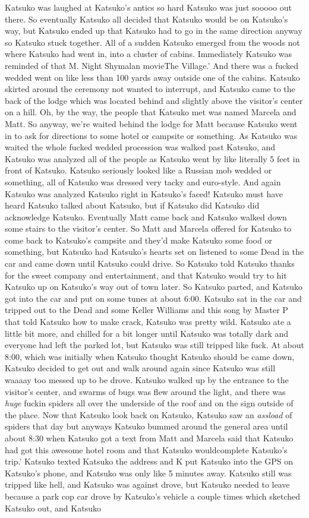 \documentclass[12pt]{book}
\begin{document}
Katsuko was laughed at Katsuko's antics so hard Katsuko was just sooooo out there. So eventually Katsuko all decided that Katsuko would be on Katsuko's way, but Katsuko ended up that Katsuko had to go in the same direction anyway so Katsuko stuck together. All of a sudden Katsuko emerged from the woods not where Katsuko had went in, into a cluster of cabins. Immediately Katsuko was reminded of that M. Night Shymalan movieThe Village.' And there was a fucked wedded went on like less than 100 yards away outside one of the cabins. Katsuko skirted around the ceremony not wanted to interrupt, and Katsuko came to the back of the lodge which was located behind and slightly above the visitor's center on a hill. Oh, by the way, the people that Katsuko met was named Marcela and Matt. So anyway, we're waited behind the lodge for Matt because Katsuko went in to ask for directions to some hotel or campsite or something. As Katsuko was waited the whole fucked wedded procession was walked past Katsuko, and Katsuko was analyzed all of the people as Katsuko went by like literally 5 feet in front of Katsuko. Katsuko seriously looked like a Russian mob wedded or something, all of Katsuko was dressed very tacky and euro-style. And again Katsuko was analyzed Katsuko right in Katsuko's faced! Katsuko must have heard Katsuko talked about Katsuko, but if Katsuko did Katsuko did acknowledge Katsuko. Eventually Matt came back and Katsuko walked down some stairs to the visitor's center. So Matt and Marcela offered for Katsuko to come back to Katsuko's campsite and they'd make Katsuko some food or something, but Katsuko had Katsuko's hearts set on listened to some Dead in the car and came down until Katsuko could drive. So Katsuko told Katsuko thanks for the sweet company and entertainment, and that Katsuko would try to hit Katsuko up on Katsuko's way out of town later. So Katsuko parted, and Katsuko got into the car and put on some tunes at about 6:00. Katsuko sat in the car and tripped out to the Dead and some Keller Williams and this song by Master P that told Katsuko how to make crack, Katsuko was pretty wild. Katsuko ate a little bit more, and chilled for a bit longer until Katsuko was totally dark and everyone had left the parked lot, but Katsuko was still tripped like fuck. At about 8:00, which was initially when Katsuko thought Katsuko should be came down, Katsuko decided to get out and walk around again since Katsuko was still waaaay too messed up to be drove. Katsuko walked up by the entrance to the visitor's center, and swarms of bugs was flew around the light, and there was \emph{huge} fuckin spiders all over the underside of the roof and on the sign outside of the place. Now that Katsuko look back on Katsuko, Katsuko saw an \emph{assload} of spiders that day but anyways Katsuko bummed around the general area until about 8:30 when Katsuko got a text from Matt and Marcela said that Katsuko had got this awesome hotel room and that Katsuko wouldcomplete Katsuko's trip.' Katsuko texted Katsuko the address and K put Katsuko into the GPS on Katsuko's phone, and Katsuko was only like 5 minutes away. Katsuko still was tripped like hell, and Katsuko was against drove, but Katsuko needed to leave because a park cop car drove by Katsuko's vehicle a couple times which sketched Katsuko out, and Katsuko 
\end{document}
